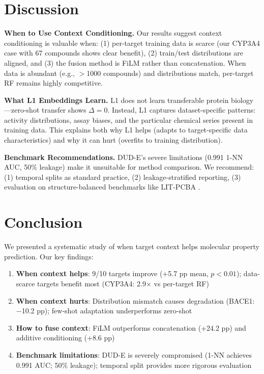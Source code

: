 \documentclass[runningheads]{llncs}
\begin{document}
\FloatBarrier
\section{Discussion}
\label{sec:discussion}

\textbf{When to Use Context Conditioning.}
Our results suggest context conditioning is valuable when: (1) per-target training data is scarce (our CYP3A4 case with 67 compounds shows clear benefit), (2) train/test distributions are aligned, and (3) the fusion method is FiLM rather than concatenation. When data is abundant (e.g., $>$1000 compounds) and distributions match, per-target RF remains highly competitive.

\textbf{What L1 Embeddings Learn.}
L1 does not learn transferable protein biology---zero-shot transfer shows $\Delta = 0$. Instead, L1 captures dataset-specific patterns: activity distributions, assay biases, and the particular chemical series present in training data. This explains both why L1 helps (adapts to target-specific data characteristics) and why it can hurt (overfits to training distribution).

\textbf{Benchmark Recommendations.}
DUD-E's severe limitations (0.991 1-NN AUC, 50\% leakage) make it unsuitable for method comparison. We recommend: (1) temporal splits as standard practice, (2) leakage-stratified reporting, (3) evaluation on structure-balanced benchmarks like LIT-PCBA \cite{tran_2020_litpcba}.

\FloatBarrier
\section{Conclusion}
\label{sec:conclusion}

We presented a systematic study of when target context helps molecular property prediction. Our key findings:

\begin{enumerate}[noitemsep,topsep=2pt]
\item \textbf{When context helps}: 9/10 targets improve (+5.7 pp mean, $p < 0.01$); data-scarce targets benefit most (CYP3A4: 2.9$\times$ vs per-target RF)
\item \textbf{When context hurts}: Distribution mismatch causes degradation (BACE1: $-$10.2 pp); few-shot adaptation underperforms zero-shot
\item \textbf{How to fuse context}: FiLM outperforms concatenation (+24.2 pp) and additive conditioning (+8.6 pp)
\item \textbf{Benchmark limitations}: DUD-E is severely compromised (1-NN achieves 0.991 AUC; 50\% leakage); temporal split provides more rigorous evaluation
\end{enumerate}
\end{document}
